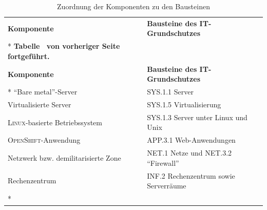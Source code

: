 \begin{longtable}{@{}lp{8.0cm}@{}}
	\toprule[1.5pt]
	\textbf{Komponente} & \textbf{Bausteine des IT-Grundschutzes} \\* \midrule
	\endfirsthead
	\multicolumn{2}{c}%
	{{\bfseries Tabelle \thetable\ von vorheriger Seite fortgeführt.}} \\
	\toprule
	\textbf{Komponente} & \textbf{Bausteine des IT-Grundschutzes} \\* \midrule
	\endhead
	\bottomrule
	\endfoot
	\endlastfoot
	\enquote{Bare metal}-Server & SYS.1.1 Server\\
	Virtualisierte Server & SYS.1.5 Virtualisierung \\
	\textsc{Linux}-basierte Betriebssystem & SYS.1.3 Server unter Linux und Unix\\
	\textsc{OpenShift}-Anwendung & APP.3.1 Web-Anwendungen\\
	\pagebreak
	Netzwerk bzw. demilitarisierte Zone & NET.1 Netze und NET.3.2 \enquote{Firewall}\\
	Rechenzentrum & INF.2 Rechenzentrum sowie Serverräume\\* 
	
	\bottomrule[1.5pt]
	
	\caption{Zuordnung der Komponenten zu den Bausteinen}\label{tab:zuordnungKompBau}\\
\end{longtable}

